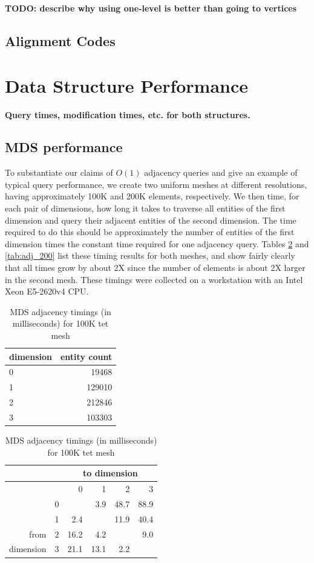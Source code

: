 {\bf TODO: describe why using one-level is better than going to vertices}

\subsection{Alignment Codes}

\section{Data Structure Performance}

{\bf Query times, modification times, etc. for both structures.}

\subsection{MDS performance}

To substantiate our claims of $O(1)$ adjacency queries and
give an example of typical query performance, we create two
uniform meshes at different resolutions, having approximately
100K and 200K elements, respectively.
We then time, for each pair of dimensions, how long it takes
to traverse all entities of the first dimension and query their
adjacent entities of the second dimension.
The time required to do this should be approximately the number
of entities of the first dimension times the constant time
required for one adjacency query.
Tables \ref{tab:adj_100} and \ref{tab:adj_200} list these timing
results for both meshes, and show fairly clearly that all times
grow by about 2X since the number of elements is about 2X larger
in the second mesh.
These timings were collected on a workstation with an Intel Xeon E5-2620v4 CPU.

\begin{table}
\caption{MDS adjacency timings (in milliseconds) for 100K tet mesh}
\label{tab:adj_100}
\begin{center}
\begin{tabular}{l|r|}
dimension & entity count \\\hline
0 & 19468 \\
1 & 129010 \\
2 & 212846 \\
3 & 103303 \\
\end{tabular}
\begin{tabular}{|r|r|r r r r}
               &   & \multicolumn{4}{c}{to dimension} \\\hline
               &   &    0 &    1 &    2 &   3  \\\hline
               & 0 &      &  3.9 & 48.7 & 88.9 \\
               & 1 &  2.4 &      & 11.9 & 40.4 \\
from           & 2 & 16.2 &  4.2 &      &  9.0 \\
dimension      & 3 & 21.1 & 13.1 &  2.2 &      \\
\end{tabular}
\end{center}
\end{table}

